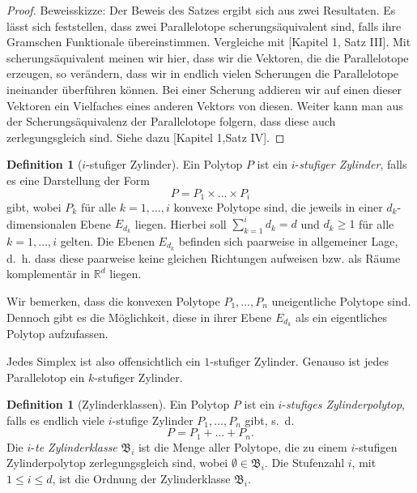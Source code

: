 \documentclass[11pt,titlepage]{article}
\newcommand{\setR}{\mathbb{R}}
\theoremstyle{definition}
\newtheorem{definition}[theorem]{Definition}
\theoremstyle{remark}
\begin{document}
	\begin{proof}
		Beweisskizze: Der Beweis des Satzes ergibt sich aus zwei 
		Resultaten. Es lässt sich feststellen, dass zwei Parallelotope 
		scherungsäquivalent sind, falls ihre Gramschen Funktionale übereinstimmen. 
		Vergleiche mit \cite{Hadwiger}[Kapitel 1, Satz III].
		Mit scherungsäquivalent meinen wir hier, dass wir die 
		Vektoren, die die Parallelotope erzeugen, so verändern, dass wir 
		in endlich vielen Scherungen die Parallelotope ineinander 
		überführen können. Bei einer Scherung addieren wir auf einen 
		dieser Vektoren ein Vielfaches eines anderen Vektors von diesen.
		Weiter kann man aus der Scherungsäquivalenz der Parallelotope folgern, 
		dass diese auch zerlegungsgleich sind. Siehe dazu 
		\cite{Hadwiger}[Kapitel 1,Satz IV].
	\end{proof}
	
	\begin{definition}[$i$-stufiger Zylinder]
		Ein Polytop $P$ ist ein $i$-\textsl{stufiger Zylinder}, falls es eine Darstellung 
		der Form
		\[P=P_1 \times\ldots\times P_i\]
		gibt, wobei $P_k$ für alle $k=1,\ldots,i$ konvexe Polytope sind, die jeweils in einer $d_k$-dimensionalen Ebene $E_{d_k}$ liegen. Hierbei soll $\sum_{k=1}^i d_k =d$ und $d_k\geq 1$ für alle $k=1,\ldots,i$ 
		gelten. Die Ebenen $E_{d_k}$ befinden sich paarweise in allgemeiner Lage, d.~h. dass diese paarweise keine gleichen Richtungen aufweisen 
		bzw. als Räume komplementär in $\setR^d$ liegen.
	\end{definition}
	
	Wir bemerken, dass die konvexen Polytope $P_1,\ldots,P_n$ uneigentliche 
	Polytope sind. Dennoch gibt es die Möglichkeit, diese in ihrer Ebene 
	$E_{d_k}$ als ein eigentliches Polytop aufzufassen.
	
	Jedes Simplex ist also offensichtlich ein $1$-stufiger Zylinder. Genauso 
	ist jedes Parallelotop ein $k$-stufiger Zylinder. 
	
	\begin{definition}[Zylinderklassen]
		Ein Polytop $P$ ist ein $i$-\textsl{stufiges Zylinderpolytop}, falls 
		es endlich viele $i$-stufige Zylinder $P_1,\ldots,P_n$ gibt, s.~d.
		\[P=P_1+\ldots+P_n.\]
		Die $i$-\textsl{te Zylinderklasse} $\mathfrak{B}_i$ ist die Menge aller 
		Polytope, die zu einem $i$-stufigen Zylinderpolytop zerlegungsgleich 
		sind, wobei $\emptyset\in\mathfrak{B}_i$. 
		Die Stufenzahl $i$, mit $1\leq i\leq  d$, ist die Ordnung 
		der Zylinderklasse $\mathfrak{B}_i$.
	\end{definition}
	
\end{document}
